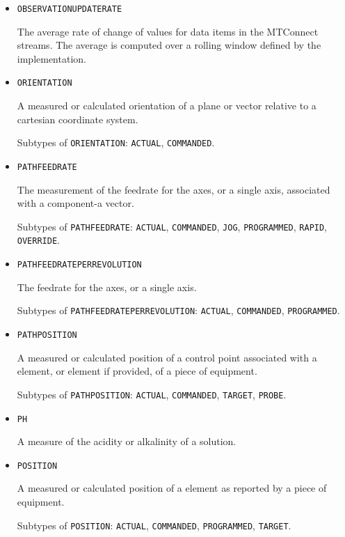 \begin{itemize}
\item \texttt{OBSERVATION\textunderscore UPDATE\textunderscore RATE}  

The average rate of change of values for data items in the MTConnect streams. The average is computed over a rolling window defined by the implementation.


\item \texttt{ORIENTATION}  

A measured or calculated orientation of a plane or vector relative to a cartesian coordinate system.

Subtypes of \texttt{ORIENTATION}: \texttt{ACTUAL}, \texttt{COMMANDED}.

\item \texttt{PATH\textunderscore FEEDRATE}  

The measurement of the feedrate for the axes, or a single axis, associated with a  component-a vector.

Subtypes of \texttt{PATH\textunderscore FEEDRATE}: \texttt{ACTUAL}, \texttt{COMMANDED}, \texttt{JOG}, \texttt{PROGRAMMED}, \texttt{RAPID}, \texttt{OVERRIDE}.

\item \texttt{PATH\textunderscore FEEDRATE\textunderscore PER\textunderscore REVOLUTION}  

The feedrate for the axes, or a single axis.

Subtypes of \texttt{PATH\textunderscore FEEDRATE\textunderscore PER\textunderscore REVOLUTION}: \texttt{ACTUAL}, \texttt{COMMANDED}, \texttt{PROGRAMMED}.

\item \texttt{PATH\textunderscore POSITION}  

A measured or calculated position of a control point associated with a  element, or  element if provided, of a piece of equipment.

Subtypes of \texttt{PATH\textunderscore POSITION}: \texttt{ACTUAL}, \texttt{COMMANDED}, \texttt{TARGET}, \texttt{PROBE}.

\item \texttt{PH}  

A measure of the acidity or alkalinity of a solution.


\item \texttt{POSITION}  

A measured or calculated position of a  element as reported by a piece of equipment.

Subtypes of \texttt{POSITION}: \texttt{ACTUAL}, \texttt{COMMANDED}, \texttt{PROGRAMMED}, \texttt{TARGET}.


\end{itemize}
